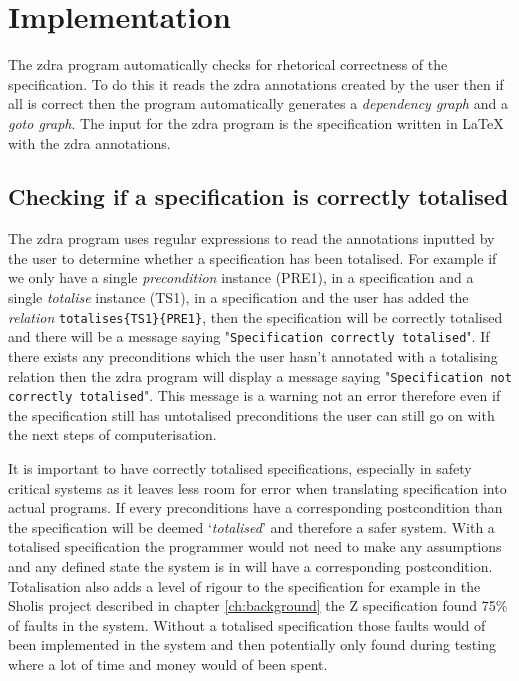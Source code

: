 \section{Implementation}
\label{sec:zdra_implement}

The \gls{zdra} program automatically checks for rhetorical correctness of the
specification. To do this it reads the \gls{zdra} annotations created by the
user then if all is correct then the program automatically generates a
\emph{dependency graph} and a \emph{goto graph}. The input for the \gls{zdra}
program is the specification written in \LaTeX{} with the \gls{zdra}
annotations.

\subsection{Checking if a specification is correctly totalised}
\label{subsec:correctlytotalised}

The \gls{zdra} program uses regular expressions to read the annotations inputted
by the user to determine whether a specification has been totalised. For example
if we only have a single \emph{precondition} instance (PRE1), in a specification
and a single \emph{totalise} instance (TS1), in a specification and the user has
added the \emph{relation} \verb|totalises{TS1}{PRE1}|, then the specification
will be correctly totalised and there will be a message saying
"\texttt{Specification correctly totalised}". If there exists any preconditions
which the user hasn't annotated with a totalising relation then the \gls{zdra}
program will display a message saying "\texttt{Specification not correctly
totalised}". This message is a warning not an error therefore even if the
specification still has untotalised preconditions the user can still go on with
the next steps of computerisation.

It is important to have correctly totalised specifications, especially in safety
critical systems as it leaves less room for error when translating specification
into actual programs. If every preconditions have a corresponding postcondition
than the specification will be deemed `\emph{totalised}' and therefore a safer
system. With a totalised specification the programmer would not need to make any
assumptions and any defined state the system is in will have a corresponding
postcondition. Totalisation also adds a level of rigour to the specification for
example in the Sholis project \cite{sholis} described in chapter
\ref{ch:background} the Z specification found 75\% of faults in the system.
Without a totalised specification those faults would of been implemented in the
system and then potentially only found during testing where a lot of time and
money would of been spent.

